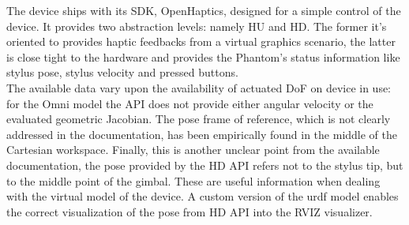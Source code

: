 The device ships with its SDK, OpenHaptics, designed for a simple control of the device.
It provides two abstraction levels: namely HU and HD. The former it's oriented to provides haptic feedbacks from a virtual graphics scenario, the latter is close tight to the hardware and provides the Phantom's status information like stylus pose, stylus velocity and pressed buttons.\\
The available data vary upon the availability of actuated DoF on device in use: for the Omni model the API does not provide either angular velocity or the evaluated geometric Jacobian.
The pose frame of reference, which is not clearly addressed in the documentation, has been empirically found in the middle of the Cartesian workspace.
Finally, this is another unclear point from the available documentation, the pose provided by the HD API refers not to the stylus tip, but to the middle point of the gimbal.
These are useful information when dealing with the virtual model of the device.
A custom version of the urdf model \cite{Omni_urdf} enables the correct visualization of the pose from HD API into the RVIZ visualizer.

